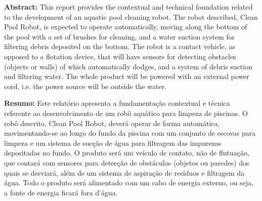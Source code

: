 \begin{abstractenv}
\textbf{Abstract:} This report provides the contextual and technical foundation
related to the development of an aquatic pool cleaning robot. The robot
described, Clean Pool Robot, is expected to operate automatically, moving along
the bottom of the pool with a set of brushes for cleaning, and a water suction
system for filtering debris deposited on the bottom. The robot is a contact
vehicle, as opposed to a flotation device, that will have sensors for detecting
obstacles (objects or walls) of which automatically dodges, and a system of
debris suction and filtering  water. The whole product will be powered with an
external power cord, i.e.  the power source will be outside the water.
\end{abstractenv}


\begin{abstractenv}
\textbf{Resumo:} Este relatório apresenta a fundamentação contextual e técnica
referente ao desenvolvimento de um robô aquático para limpeza de piscinas.
O robô descrito, Clean Pool Robot, deverá operar de forma automática, 
movimentando-se ao longo do fundo da piscina com um conjunto de escovas para 
limpeza e um sistema de sucção de água para filtragem das impurezas depositadas 
no fundo. O produto será um veículo de contato, não de flutuação, que contará 
com sensores para detecção de obstáculos (objetos ou paredes) dos quais se 
desviará, além de um sistema de aspiração de resíduos e filtragem da água. Todo 
o produto será alimentado com um cabo de energia externo, ou seja, a fonte de 
energia ficará fora d’água.
\end{abstractenv}